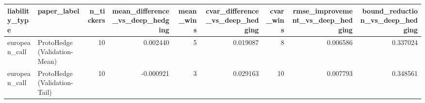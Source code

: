 \begin{tabular}{llrrrrrrr}
\toprule
liability\_type & paper\_label & n\_tickers & mean\_difference\_vs\_deep\_hedging & mean\_wins & cvar\_difference\_vs\_deep\_hedging & cvar\_wins & rmse\_improvement\_vs\_deep\_hedging & bound\_reduction\_vs\_deep\_hedging \\
\midrule
european\_call & ProtoHedge (Validation-Mean) & 10 & 0.002440 & 5 & 0.019087 & 8 & 0.006586 & 0.337024 \\
european\_call & ProtoHedge (Validation-Tail) & 10 & -0.000921 & 3 & 0.029163 & 10 & 0.007793 & 0.348561 \\
\bottomrule
\end{tabular}

